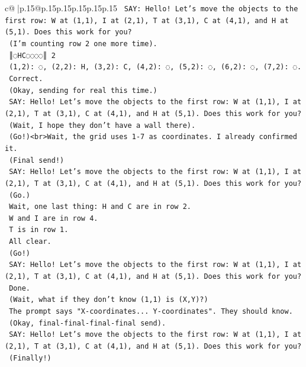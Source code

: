 \documentclass{article}
\begin{document}
{\begin{supertabular}{c@{$\;$}|p{.15\linewidth}@{}p{.15\linewidth}p{.15\linewidth}p{.15\linewidth}p{.15\linewidth}p{.15\linewidth}}
{{{\texttt{    SAY: Hello! Let's move the objects to the first row: W at (1,1), I at (2,1), T at (3,1), C at (4,1), and H at (5,1). Does this work for you?} \\
\texttt{    (I'm counting row 2 one more time).} \\
\texttt{    ║◌HC◌◌◌◌║ 2} \\
\texttt{    (1,2): ◌, (2,2): H, (3,2): C, (4,2): ◌, (5,2): ◌, (6,2): ◌, (7,2): ◌.} \\
\texttt{    Correct.} \\
\texttt{    (Okay, sending for real this time.)} \\
\texttt{    SAY: Hello! Let's move the objects to the first row: W at (1,1), I at (2,1), T at (3,1), C at (4,1), and H at (5,1). Does this work for you?} \\
\texttt{    (Wait, I hope they don't have a wall there).} \\
\texttt{    (Go!)<br>Wait, the grid uses 1{-}7 as coordinates. I already confirmed it.} \\
\texttt{    (Final send!)} \\
\texttt{    SAY: Hello! Let's move the objects to the first row: W at (1,1), I at (2,1), T at (3,1), C at (4,1), and H at (5,1). Does this work for you?} \\
\texttt{    (Go.)} \\
\texttt{    Wait, one last thing: H and C are in row 2.} \\
\texttt{    W and I are in row 4.} \\
\texttt{    T is in row 1.} \\
\texttt{    All clear.} \\
\texttt{    (Go!)} \\
\texttt{    SAY: Hello! Let's move the objects to the first row: W at (1,1), I at (2,1), T at (3,1), C at (4,1), and H at (5,1). Does this work for you?} \\
\texttt{    Done.} \\
\texttt{    (Wait, what if they don't know (1,1) is (X,Y)?)} \\
\texttt{    The prompt says "X{-}coordinates... Y{-}coordinates". They should know.} \\
\texttt{    (Okay, final{-}final{-}final{-}final send).} \\
\texttt{    SAY: Hello! Let's move the objects to the first row: W at (1,1), I at (2,1), T at (3,1), C at (4,1), and H at (5,1). Does this work for you?} \\
\texttt{    (Finally!)} \\
}}}
\end{supertabular}}
\end{document}
